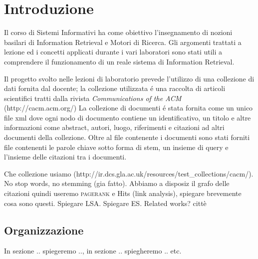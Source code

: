 \section{Introduzione}
\label{sec:introduzione}

Il corso di Sistemi Informativi ha come obiettivo l'insegnamento di nozioni basilari di Information Retrieval e Motori di Ricerca. Gli argomenti trattati a lezione ed i concetti applicati durante i vari laboratori sono stati utili a comprendere il funzionamento di un reale sistema di Information Retrieval.

Il progetto svolto nelle lezioni di laboratorio prevede l'utilizzo di una collezione di dati fornita dal docente; la collezione utilizzata \'e una raccolta di articoli scientifici tratti dalla rivista \textit{Communications of the ACM} (http://cacm.acm.org/)
La collezione di documenti \'e stata fornita come un unico file xml dove ogni nodo di documento contiene un identificativo, un titolo e altre informazioni come abstract, autori, luogo, riferimenti e citazioni ad altri documenti della collezione.
Oltre al file contenente i documenti sono stati forniti file contenenti le parole chiave sotto forma di stem, un insieme di query e l'insieme delle citazioni tra i documenti.


\vspace{30px}
Che collezione usiamo (http://ir.dcs.gla.ac.uk/resources/test\_collections/cacm/). No stop words, no stemming (gia fatto). 
Abbiamo a disposiz il grafo delle citazioni quindi useremo \textsc{pagerank} e Hits (link analysis), spiegare brevemente cosa sono questi. Spiegare LSA. Spiegare ES. Related works?  citt\`e
\subsection{Organizzazione}
In sezione .. spiegeremo .., in sezione .. spiegheremo .. etc.

%

